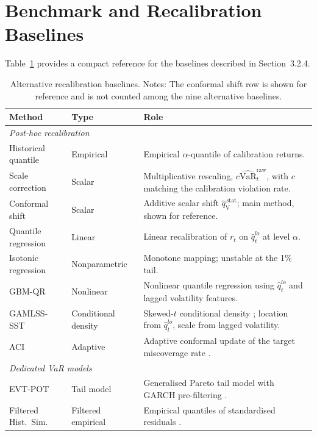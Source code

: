 \documentclass[preprint,11pt,authoryear]{elsarticle}
\newcommand{\VaR}{\mathrm{VaR}}
\newcommand{\1}{\boldsymbol{1}}
\newcommand{\qVstat}{\hat{q}_{\scriptscriptstyle\mathrm{V}}^{\,\mathrm{stat}}}
\begin{document}
\section{Benchmark and Recalibration Baselines}
\label{app:benchmarks}

Table~\ref{tab:alt_baselines} provides a compact reference for the
baselines described in Section~3.2.4.

\begin{table}[htbp]
	\centering
	\caption{Alternative recalibration baselines.
		Notes: The conformal shift row is shown for reference and is not
		counted among the nine alternative baselines.}
	\label{tab:alt_baselines}
	\scriptsize
	\begin{tabular}{llp{6.0cm}}
		\hline\hline
		Method & Type & Role \\
		\hline
		\multicolumn{3}{l}{\emph{Post-hoc recalibration}} \\
		Historical quantile & Empirical & Empirical $\alpha$-quantile of calibration returns. \\
		Scale correction & Scalar & Multiplicative rescaling, $c\widehat{\VaR}^{\mathrm{raw}}_t$, with $c$ matching the calibration violation rate. \\
		Conformal shift & Scalar & Additive scalar shift $\qVstat$; main method, shown for reference. \\
		Quantile regression & Linear & Linear recalibration of $r_t$ on $\hat q_t^{lo}$ at level $\alpha$. \\
		Isotonic regression & Nonparametric & Monotone mapping; unstable at the 1\% tail. \\
		GBM-QR & Nonlinear & Nonlinear quantile regression using $\hat q_t^{lo}$ and lagged volatility features. \\
		GAMLSS-SST & Conditional density & Skewed-$t$ conditional density \citep{rigby2005generalized}; location from $\hat q_t^{lo}$, scale from lagged volatility. \\
		ACI & Adaptive & Adaptive conformal update of the target miscoverage rate \citep{gibbs2021adaptive}. \\
		\hline
		\multicolumn{3}{l}{\emph{Dedicated VaR models}} \\
		EVT-POT & Tail model & Generalised Pareto tail model with GARCH pre-filtering \citep{mcneil2000estimation}. \\
		Filtered Hist.\ Sim. & Filtered empirical & Empirical quantiles of standardised residuals \citep{baroneadesi1999var}. \\
		\hline\hline
	\end{tabular}
\end{table}
\end{document}
